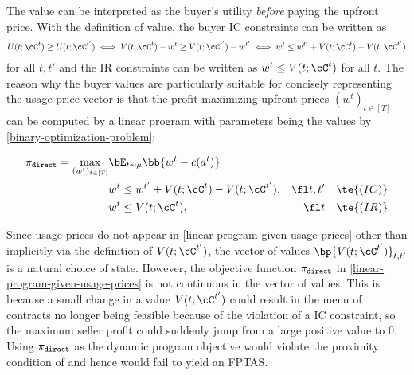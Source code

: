 The value can be interpreted as the buyer's utility \emph{before} paying the upfront price. With the definition of value, the buyer IC constraints can be written as
\begin{align*}
    U(t; \cC^t) \ge U(t; \cC^{t'}) \iff  V(t; \cC^t) - w^t \ge V(t; \cC^{t'}) - w^{t'} \iff  w^t \le w^{t'} + V(t; \cC^t) - V(t; \cC^{t'}) 
\end{align*}
for all $t,t'$ and the IR constraints can be written as $w^t \le V(t;\cC^t)$ for all $t$. The reason why the buyer values are particularly suitable for concisely representing the usage price vector is that the profit-maximizing upfront prices $(w^t)_{t\in [T]}$ can be computed by a linear program with parameters being the values by \cref{binary-optimization-problem}:

\begin{tcolorbox}[title=Maximizing profit in direct menus fixing actions and values]
    \begin{align} 
        \pi_{\tt{direct}} = \max_{(w^t)_{t\in [T]}} &  \bE_{t\sim \mu} \bb{w^t - c(a^t)} \label{linear-program-given-usage-prices} \\
        & w^t \le w^{t'} + V(t; \cC^t) - V(t; \cC^{t'}), & \fl t,t' && \te{(IC)} \notag \\
            & w^t \le V(t;\cC^t),  & \fl t && \te{(IR)} \notag
\end{align}
\end{tcolorbox}




Since usage prices do not appear in \cref{linear-program-given-usage-prices} other than implicitly via the definition of $V(t;\cC^{t'})$, the vector of values $\bp{V(t;\cC^{t'})}_{t,t'}$ is a natural choice of state. However, the objective function $\pi_{\tt{direct}}$ in \cref{linear-program-given-usage-prices} is not continuous in the vector of values. This is because a small change in a value $V(t;\cC^{t'})$ could result in the menu of contracts no longer being feasible because of the violation of a IC constraint, so the maximum seller profit could suddenly jump from a large positive value to 0. Using $\pi_{\tt{direct}}$ as the dynamic program objective would violate the proximity condition of \citet{woeginger2000} and hence would fail to yield an FPTAS.

